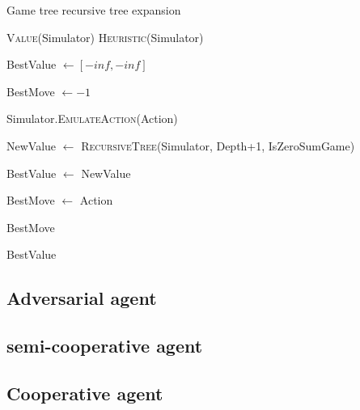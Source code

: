 \documentclass{article}                     %
\begin{document}
	\begin{algorithm}[H]
		\label{al:recursive}
		\caption{Game tree recursive tree expansion}
		\begin{algorithmic}[1]
	       \State \Return \textsc{Value}(Simulator)
	       \EndIf
	       \State \Return \textsc{Heuristic}(Simulator)
			\EndIf
			
			\State BestValue $\longleftarrow  [-inf, -inf] $
			
			\State BestMove  $\longleftarrow -1 $
			
			\label{al:actions}
			
				\State Simulator.\textsc{EmulateAction}(Action)
				
				\State NewValue $ \leftarrow $ \textsc{RecursiveTree}(Simulator, Depth+1, IsZeroSumGame)
				
				
				\State BestValue $ \longleftarrow $ NewValue
				
				\State BestMove $ \longleftarrow $ Action
				\EndIf
				
				 \label{al:alphabeta}
				
				\EndIf
				
			\EndFor
			
			
				\Return BestMove
				
			\Else
			
				\Return BestValue
				
			\EndIf
			\EndProcedure
		\end{algorithmic}

	\end{algorithm}
			
	\subsection{Adversarial agent}
	
	\subsection{semi-cooperative agent}
		
	\subsection{Cooperative agent}
\end{document}
